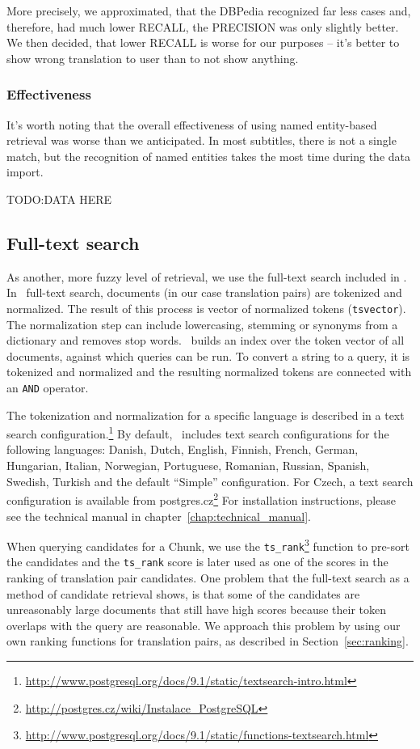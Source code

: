 More precisely, we approximated, that the DBPedia recognized far less cases and, therefore, had much lower RECALL, the PRECISION was only slightly better. We then decided, that lower RECALL is worse for our purposes -- it's better to show wrong translation to user than to not show anything.

\subsubsection*{Effectiveness}
It's worth noting that the overall effectiveness of using named entity-based retrieval was worse than we anticipated. In most subtitles, there is not a single match, but the recognition of named entities takes the most time during the data import.  

TODO:DATA HERE


\subsection{Full-text search}

As another, more fuzzy level of retrieval, we use the full-text search included in \postgres. In  \postgres~full-text search, documents (in our case translation pairs) are tokenized and normalized. The result of this process is vector of normalized tokens ({\tt tsvector}). The normalization step can include lowercasing, stemming or synonyms from a dictionary and removes stop words. \postgres~builds an index over the token vector of all documents, against which queries can be run. To convert a string to a query, it is tokenized and normalized and the resulting normalized tokens are connected with an {\tt AND} operator.

The tokenization and normalization for a specific language is described in a text search configuration.\footnote{\url{http://www.postgresql.org/docs/9.1/static/textsearch-intro.html}} By default, \postgres~includes text search configurations for the following languages: Danish, Dutch, English, Finnish, French, German, Hungarian, Italian, Norwegian, Portuguese, Romanian, Russian, Spanish, Swedish, Turkish and the default ``Simple'' configuration. For Czech, a text search configuration is available from postgres.cz\footnote{\url{http://postgres.cz/wiki/Instalace_PostgreSQL}} For installation instructions, please see the technical manual in chapter~\ref{chap:technical_manual}.

When querying candidates for a Chunk, we use the {\tt ts\_rank}\footnote{\url{http://www.postgresql.org/docs/9.1/static/functions-textsearch.html}} function to pre-sort the candidates and the {\tt ts\_rank} score is later used as one of the scores in the ranking of translation pair candidates. One problem that the full-text search as a method of candidate retrieval shows, is that some of the candidates are unreasonably large documents that still have high scores because their token overlaps with the query are reasonable. We approach this problem by using our own ranking functions for translation pairs, as described in Section~\ref{sec:ranking}.



